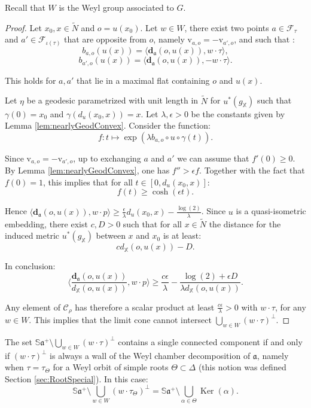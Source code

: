 \documentclass[reqno,10pt]{amsart}
\theoremstyle{plain}
\theoremstyle{definition}
\theoremstyle{remark}
\newcommand{\type}{\tau}
\newcommand{\Sph}{\mathbb{S}}
\newcommand{\da}{\mathbf{d}_{\mathfrak{a}}}
\DeclareMathOperator{\Ker}{Ker}
\newcommand{\X}{\mathbb{X}}
\newcommand{\ie}{namely }
\begin{document}
Recall that $W$ is the Weyl group associated to $G$.

\medskip

\begin{proof}
Let $x_0,x\in \widetilde{N}$ and $o=u(x_0)$. Let $w\in W$, there exist two points $a\in \mathcal{F}_\type$  and $a'\in \mathcal{F}_{\iota(\type)}$ that are opposite from $o$, \ie $\mathrm{v}_{a,o}=-\mathrm{v}_{a',o}$, and such that :
$$b_{a,o}(u(x))=\langle\da(o,u(x)),w\cdot \type\rangle,$$
$$b_{a',o}(u(x))=\langle\da(o,u(x)),-w\cdot \type\rangle.$$

This holds for $a,a'$ that lie in a maximal flat containing $o$ and $u(x)$. 

\medskip

Let $\eta$ be a geodesic parametrized with unit length in $\widetilde{N}$ for $u^*(g_\X)$ such that $\gamma(0)=x_0$ and $\gamma(d_u(x_0,x))=x$. Let $\lambda,\epsilon>0$ be the constants given by Lemma \ref{lem:nearlyGeodConvex}. Consider the function:
$$f:t\mapsto \exp\left(\lambda b_{a,o}\circ u\circ \gamma(t)\right).$$

Since $\mathrm{v}_{a,o}=-\mathrm{v}_{a',o}$, up to exchanging $a$ and $a'$ we can assume that $f'(0)\geq 0$. By Lemma \ref{lem:nearlyGeodConvex}, one has $f''>\epsilon f$. Together with the fact that $f(0)=1$, this implies that for all $t\in [0,d_u(x_0,x)]$:
$$f(t)\geq \cosh(\epsilon t).$$

Hence $\langle\da(o,u(x)),w\cdot p\rangle\geq \frac{\epsilon}{\lambda} d_u(x_0,x) -\frac{\log(2)}{\lambda}$. Since $u$ is a quasi-isometric embedding, there exist $c,D>0$ such that for all $x\in \widetilde{N}$ the distance for the induced metric $u^*(g_\X)$ between $x$ and $x_0$ is at least:
 $$c d_\X(o, u(x))-D.$$

 In conclusion:
$$\langle\frac{\da(o,u(x))}{d_\X(o,u(x))},w\cdot p\rangle\geq\frac{c\epsilon}{\lambda}- \frac{\log(2)+\epsilon D}{\lambda d_\X(o,u(x))}.$$

Any element of $\mathcal{C}_\rho$ has therefore a scalar product at least $\frac{c\epsilon}{\lambda}>0$ with $w\cdot \type$, for any $w\in W$. This implies that the limit cone cannot intersect $\bigcup_{w\in W} (w\cdot \type)^\perp$.
\end{proof}

The set $\Sph\mathfrak{a}^+\setminus \bigcup_{w\in W} (w\cdot \type)^\perp$ contains a single connected component if and only if $(w\cdot \type)^\perp$ is always a wall of the Weyl chamber decomposition of $\mathfrak{a}$, \ie when $\type=\type_\Theta$ for a Weyl orbit of simple roots  $\Theta\subset \Delta$ (this notion was defined Section \ref{sec:RootSpecial}). In this case:
$$\Sph\mathfrak{a}^+\setminus \bigcup_{w\in W} (w\cdot \type_\Theta)^\perp=\Sph\mathfrak{a}^+\setminus \bigcup_{\alpha\in \Theta} \Ker(\alpha).$$
\end{document}
